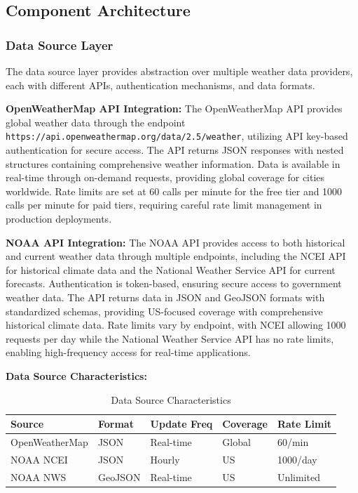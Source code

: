 \documentclass[12pt,a4paper]{article}
\begin{document}
\subsection{Component Architecture}

\subsubsection{Data Source Layer}

The data source layer provides abstraction over multiple weather data providers, each with different APIs, authentication mechanisms, and data formats.

\textbf{OpenWeatherMap API Integration:} The OpenWeatherMap API provides global weather data through the endpoint \texttt{https://api.openweathermap.org/data/2.5/weather}, utilizing API key-based authentication for secure access. The API returns JSON responses with nested structures containing comprehensive weather information. Data is available in real-time through on-demand requests, providing global coverage for cities worldwide. Rate limits are set at 60 calls per minute for the free tier and 1000 calls per minute for paid tiers, requiring careful rate limit management in production deployments.

\textbf{NOAA API Integration:} The NOAA API provides access to both historical and current weather data through multiple endpoints, including the NCEI API for historical climate data and the National Weather Service API for current forecasts. Authentication is token-based, ensuring secure access to government weather data. The API returns data in JSON and GeoJSON formats with standardized schemas, providing US-focused coverage with comprehensive historical climate data. Rate limits vary by endpoint, with NCEI allowing 1000 requests per day while the National Weather Service API has no rate limits, enabling high-frequency access for real-time applications.

\textbf{Data Source Characteristics:}
\begin{table}[H]
\centering
\begin{tabular}{|l|l|l|l|l|}
\hline
\textbf{Source} & \textbf{Format} & \textbf{Update Freq} & \textbf{Coverage} & \textbf{Rate Limit} \\
\hline
OpenWeatherMap & JSON & Real-time & Global & 60/min \\
NOAA NCEI & JSON & Hourly & US & 1000/day \\
NOAA NWS & GeoJSON & Real-time & US & Unlimited \\
\hline
\end{tabular}
\caption{Data Source Characteristics}
\label{tab:data-sources}
\end{table}
\end{document}
